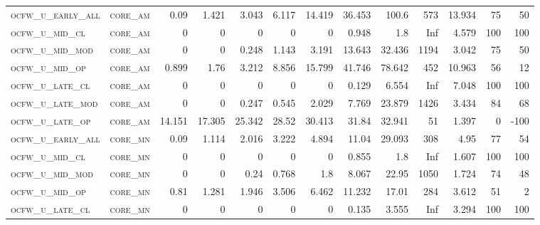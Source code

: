 \begin{landscape}
\begin{center}
\begin{footnotesize}
\begin{longtable}{llrrrrrrrr|rrr}
\textsc{ocfw\_u\_early\_all} & \textsc{core\_am  }   & 0.09     & 1.421    & 3.043    & 6.117    & 14.419   & 36.453   & 100.6     & 573    & 13.934        & 75            & 50              \\
\textsc{ocfw\_u\_mid\_cl   } & \textsc{core\_am  }   & 0        & 0        & 0        & 0        & 0        & 0.948    & 1.8       & Inf    & 4.579         & 100           & 100             \\
\textsc{ocfw\_u\_mid\_mod  } & \textsc{core\_am  }   & 0        & 0        & 0.248    & 1.143    & 3.191    & 13.643   & 32.436    & 1194   & 3.042         & 75            & 50              \\
\textsc{ocfw\_u\_mid\_op   } & \textsc{core\_am  }   & 0.899    & 1.76     & 3.212    & 8.856    & 15.799   & 41.746   & 78.642    & 452    & 10.963        & 56            & 12              \\
\textsc{ocfw\_u\_late\_cl  } & \textsc{core\_am  }   & 0        & 0        & 0        & 0        & 0        & 0.129    & 6.554     & Inf    & 7.048         & 100           & 100             \\
\textsc{ocfw\_u\_late\_mod } & \textsc{core\_am  }   & 0        & 0        & 0.247    & 0.545    & 2.029    & 7.769    & 23.879    & 1426   & 3.434         & 84            & 68              \\
\textsc{ocfw\_u\_late\_op  } & \textsc{core\_am  }   & 14.151   & 17.305   & 25.342   & 28.52    & 30.413   & 31.84    & 32.941    & 51     & 1.397         & 0             & -100            \\
\textsc{ocfw\_u\_early\_all} & \textsc{core\_mn  }   & 0.09     & 1.114    & 2.016    & 3.222    & 4.894    & 11.04    & 29.093    & 308    & 4.95          & 77            & 54              \\
\textsc{ocfw\_u\_mid\_cl   } & \textsc{core\_mn  }   & 0        & 0        & 0        & 0        & 0        & 0.855    & 1.8       & Inf    & 1.607         & 100           & 100             \\
\textsc{ocfw\_u\_mid\_mod  } & \textsc{core\_mn  }   & 0        & 0        & 0.24     & 0.768    & 1.8      & 8.067    & 22.95     & 1050   & 1.724         & 74            & 48              \\
\textsc{ocfw\_u\_mid\_op   } & \textsc{core\_mn  }   & 0.81     & 1.281    & 1.946    & 3.506    & 6.462    & 11.232   & 17.01     & 284    & 3.612         & 51            & 2               \\
\textsc{ocfw\_u\_late\_cl  } & \textsc{core\_mn  }   & 0        & 0        & 0        & 0        & 0        & 0.135    & 3.555     & Inf    & 3.294         & 100           & 100             \\

\end{longtable}
\end{footnotesize}
\end{center}
\end{landscape}
